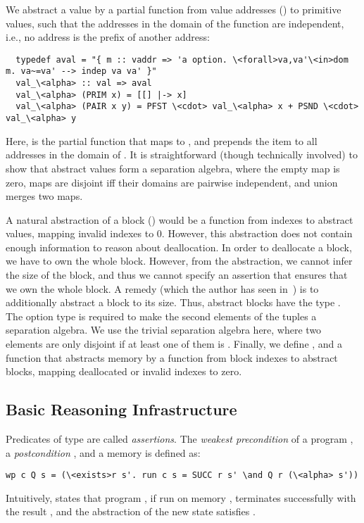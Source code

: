 \documentclass[a4paper,USenglish,cleveref, autoref]{lipics-v2019}
\begin{document}
We abstract a value by a partial function from value addresses () to primitive values, 
such that the addresses in the domain of the function are independent, i.e., no address is the prefix of another address:
\begin{lstlisting}
  typedef aval = "{ m :: vaddr => 'a option. \<forall>va,va'\<in>dom m. va~=va' --> indep va va' }"
  val_\<alpha> :: val => aval
  val_\<alpha> (PRIM x) = [[] |-> x]
  val_\<alpha> (PAIR x y) = PFST \<cdot> val_\<alpha> x + PSND \<cdot> val_\<alpha> y
\end{lstlisting}
Here, \q{\is{[k |->v]}} is the partial function that maps  to , and  
prepends the item  to all addresses in the domain of . 
It is straightforward (though technically involved) to show that abstract values form a separation algebra, 
where the empty map is zero, maps are disjoint iff their domains are pairwise independent, and union merges two maps.

A natural abstraction of a block ()
would be a function from indexes to abstract values, mapping invalid indexes to $0$. 
However, this abstraction does not contain enough information to reason about deallocation. 
In order to deallocate a block, we have to own the whole block. However, from the abstraction, we cannot infer the size of the block, and thus we cannot
specify an assertion that ensures that we own the whole block. A remedy (which the author has seen in~\cite{App14}) is to additionally 
abstract a block to its size. Thus, abstract blocks have the type . 
The option type is required to make the second elements of the tuples a separation algebra. We use the trivial separation algebra here, where
two elements are only disjoint if at least one of them is . 
Finally, we define , and a function  that abstracts memory
by a function from block indexes to abstract blocks, mapping deallocated or invalid indexes to zero.

\subsection{Basic Reasoning Infrastructure}
Predicates of type  are called \emph{assertions}.
The \emph{weakest precondition} of a program , a \emph{postcondition} , and a memory  is defined as:
\begin{lstlisting}
wp c Q s = (\<exists>r s'. run c s = SUCC r s' \and Q r (\<alpha> s'))
\end{lstlisting}
Intuitively,  states that program , if run on memory , terminates successfully with the result , and the abstraction of the new 
state  satisfies .
\end{document}
